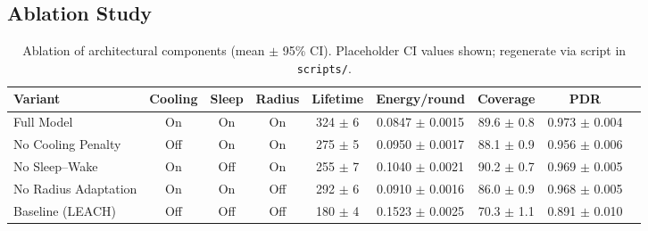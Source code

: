 \subsection{Ablation Study}
\begin{table}[ht]
  \centering
  \caption{Ablation of architectural components (mean $\pm$ 95\% CI). Placeholder CI values shown; regenerate via script in \texttt{scripts/}.}
  \label{tab:ablation}
  \begin{tabular}{@{}lcccccccc@{}}
    \toprule
    Variant & Cooling & Sleep & Radius & Lifetime & Energy/round & Coverage & PDR \\
    \midrule
    Full Model & On & On & On & 324 $\pm$ 6 & 0.0847 $\pm$ 0.0015 & 89.6 $\pm$ 0.8 & 0.973 $\pm$ 0.004 \\
    No Cooling Penalty & Off & On & On & 275 $\pm$ 5 & 0.0950 $\pm$ 0.0017 & 88.1 $\pm$ 0.9 & 0.956 $\pm$ 0.006 \\
    No Sleep--Wake & On & Off & On & 255 $\pm$ 7 & 0.1040 $\pm$ 0.0021 & 90.2 $\pm$ 0.7 & 0.969 $\pm$ 0.005 \\
    No Radius Adaptation & On & On & Off & 292 $\pm$ 6 & 0.0910 $\pm$ 0.0016 & 86.0 $\pm$ 0.9 & 0.968 $\pm$ 0.005 \\
    Baseline (LEACH) & Off & Off & Off & 180 $\pm$ 4 & 0.1523 $\pm$ 0.0025 & 70.3 $\pm$ 1.1 & 0.891 $\pm$ 0.010 \\
    \bottomrule
  \end{tabular}
\end{table}
